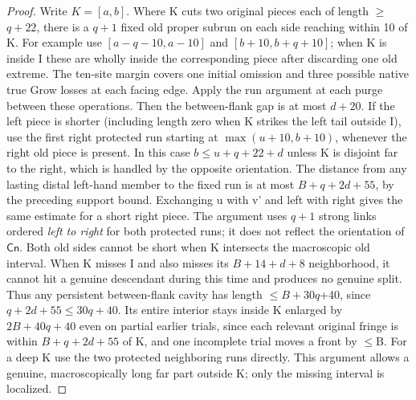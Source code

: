 \begin{proof}
Write \(K=[a,b]\). Where K cuts two original pieces each of length \(\ge\)\(q+22\), there is a \(q+1\) fixed old proper subrun on each side reaching within 10 of K. For example use \([a-q-10,a-10]\) and \([b+10,b+q+10]\); when K is inside I these are wholly inside the corresponding piece after discarding one old extreme. The ten-site margin covers one initial omission and three possible native true Grow losses at each facing edge. Apply the run argument at each purge between these operations. Then the between-flank gap is at most \(d+20\). If the left piece is shorter (including length zero when K strikes the left tail outside I), use the first right protected run starting at \(\max (u+10,b+10)\), whenever the right old piece is present. In this case \(b\le u+q+22+d\) unless K is disjoint far to the right, which is handled by the opposite orientation. The distance from any lasting distal left-hand member to the fixed run is at most \(B+q+2d+55\), by the preceding support bound. Exchanging u with v' and left with right gives the same estimate for a short right piece. The argument uses \(q+1\) strong links ordered \emph{left to right} for both protected runs; it does not reflect the orientation of \(\mathsf{Cn}\). Both old sides cannot be short when K intersects the macroscopic old interval. When K misses I and also misses its \(B+14+d+8\) neighborhood, it cannot hit a genuine descendant during this time and produces no genuine split. Thus any persistent between-flank cavity has length \(\le\)\(B+30q\)+40, since \(q+2d+55\le 30q+40\). Its entire interior stays inside K enlarged by \(2B+40q+40\) even on partial earlier trials, since each relevant original fringe is within \(B+q+2d+55\) of K, and one incomplete trial moves a front by \(\le\)B. For a deep K use the two protected neighboring runs directly. This argument allows a genuine, macroscopically long far part outside K; only the missing interval is localized.


\end{proof}
